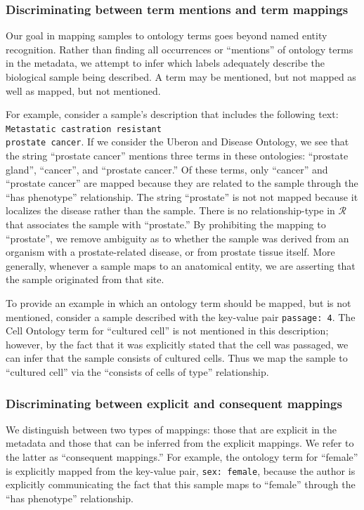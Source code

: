  \subsubsection{Discriminating between term mentions and term mappings}

Our goal in mapping samples to ontology terms goes beyond named entity recognition.  Rather than finding all occurrences or ``mentions'' of ontology terms in the metadata, we attempt to infer which labels adequately describe the biological sample being described.  A term may be mentioned, but not mapped as well as mapped, but not mentioned. 

For example, consider a sample's description that includes the following text: \texttt{Metastatic castration resistant}\\ \texttt{prostate cancer}.  If we consider the Uberon and Disease Ontology, we see that the string ``prostate cancer'' mentions three terms in these ontologies: ``prostate gland'', ``cancer'', and ``prostate cancer.'' Of these terms, only ``cancer'' and ``prostate cancer'' are mapped because they are related to the sample through the ``has phenotype'' relationship. The string ``prostate'' is not not mapped because it localizes the disease rather than the sample.  There is no relationship-type in $\mathcal{R}$ that associates the sample with ``prostate.''  By prohibiting the mapping to ``prostate'', we remove ambiguity as to whether the sample was derived from an organism with a prostate-related disease, or from prostate tissue itself.  More generally, whenever a sample maps to an anatomical entity, we are asserting that the sample originated from that site.

To provide an example in which an ontology term should be mapped, but is not mentioned, consider a sample described with the key-value pair \texttt{passage: 4}.  The Cell Ontology term for ``cultured cell'' is not mentioned in this description; however, by the fact that it was explicitly stated that the cell was passaged, we can infer that the sample consists of cultured cells. Thus we map the sample to ``cultured cell'' via the ``consists of cells of type'' relationship.

\subsubsection{Discriminating between explicit and consequent mappings}

We distinguish between two types of mappings: those that are explicit in the metadata and those that can be inferred from the explicit mappings.   We refer to the latter as ``consequent mappings.''  For example, the ontology term for ``female'' is explicitly mapped from the key-value pair, \texttt{sex: female}, because the author is explicitly communicating the fact that this sample maps to ``female'' through the ``has phenotype'' relationship.

